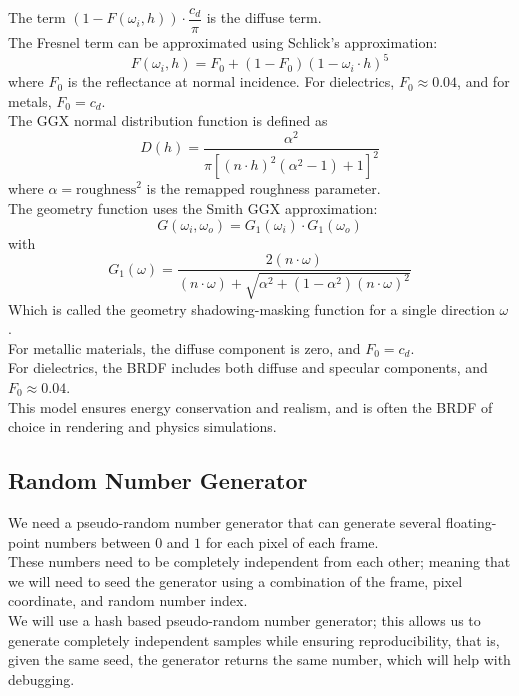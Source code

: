 \documentclass[12pt]{article}
\begin{document}
The term $(1 - F(\omega_i, h)) 
\cdot \dfrac{c_d}{\pi}$ is the diffuse term. \\

The Fresnel term can be approximated using 
Schlick's approximation:
\[ F(\omega_i, h) = F_0 + (1 - F_0)
(1 - \omega_i \cdot h)^5 \]
where $F_0$ is the reflectance at normal incidence. 
For dielectrics, $F_0 \approx 0.04$, 
and for metals, $F_0 = c_d$. \\

The GGX normal distribution function is defined as
\[ D(h) = \frac{\alpha^2}{\pi \left[ 
(n \cdot h)^2 (\alpha^2 - 1) + 1 \right]^2} \]
where $\alpha = \text{roughness}^2$ 
is the remapped roughness parameter. \\

The geometry function uses the Smith GGX approximation:
\[ G(\omega_i, \omega_o) = 
G_1(\omega_i) \cdot G_1(\omega_o) \]
with
\[ G_1(\omega) = \frac{2 (n \cdot \omega)}
{(n \cdot \omega) + \sqrt{\alpha^2 + (1 - \alpha^2)
(n \cdot \omega)^2}} \]
Which is called the geometry shadowing-masking 
function for a single direction $\omega$. \\

For metallic materials, 
the diffuse component is zero, and 
$F_0 = c_d$. \\ 
For dielectrics, the BRDF includes both 
diffuse and specular components, 
and $F_0 \approx 0.04$. \\

This model ensures energy conservation and 
realism, and is often the BRDF of choice
in rendering and physics simulations. \\

\newpage

\subsection*{Random Number Generator}

We need a pseudo-random number generator that
can generate several 
floating-point numbers between $0$
and $1$ for each pixel of each frame. \\

These numbers need to be completely independent
from each other; meaning that we will need to
seed the generator using a combination of the frame,
pixel coordinate, and random number index. \\

We will use a hash based pseudo-random number
generator; this allows us to generate completely
independent samples while ensuring reproducibility,
that is, given the same seed, the generator returns
the same number, which will help with debugging. \\

\newpage
\end{document}
